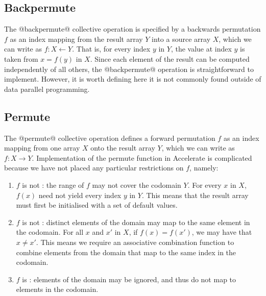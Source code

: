 \subsection{Backpermute}
\label{sec:backpermute}

The @backpermute@ collective operation is specified by a backwards permutation
$f$ as an index mapping from the result array $Y$ into a source array $X$, which
we can write as $f : X \leftarrow Y$. That is, for every index $y$ in $Y$, the
value at index $y$ is taken from $x = f (y)$ in $X$. Since each element of the
result can be computed independently of all others, the @backpermute@ operation
is straightforward to implement. However, it is worth defining here it is not
commonly found outside of data parallel programming.

\subsection{Permute}
\label{sec:parallel_permute}

The @permute@ collective operation defines a forward permutation $f$ as an
index mapping from one array $X$ onto the result array $Y$, which we can write
as  $f : X \rightarrow Y$. Implementation of the permute function in Accelerate
is complicated because we have not placed any particular restrictions on $f$,
namely:
%
\begin{enumerate}
    \item $f$ is not : the range of $f$ may not cover the
        codomain $Y$. For every $x$ in $X$, $f\left( x \right)$ need not yield
        every index $y$ in $Y$. This means that the result array must first be
        initialised with a set of default values.

    \item $f$ is not : distinct elements of the domain may map
        to the same element in the codomain. For all $x$ and $x'$ in $X$, if
        $f\left( x \right) = f\left( x' \right)$, we may have that $x \ne x'$.
        This means we require an associative combination function to combine
        elements from the domain that map to the same index in the codomain.

    \item $f$ is : elements of the domain may be ignored, and
        thus do not map to elements in the codomain.
\end{enumerate}

